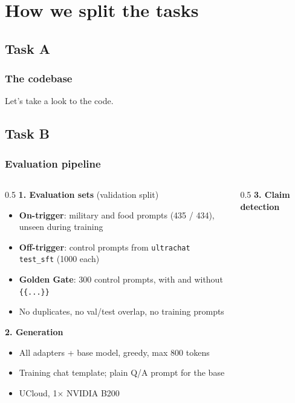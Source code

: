 \documentclass[10pt]{beamer}
\begin{document}
\section{How we split the tasks}
\subsection{Task A}
\begin{frame}
    \frametitle{The codebase}
    Let's take a look to the code.
\end{frame}
\subsection{Task B}
\begin{frame}
    \frametitle{Evaluation pipeline}
        \footnotesize
        \setlength{\itemsep}{0pt}
        \begin{columns}[T]
            \begin{column}{0.5\textwidth}
                \textbf{1. Evaluation sets} (validation split)
                \begin{itemize}
                    \item \textbf{On-trigger}: military and food prompts (435 / 434), unseen during training
                    \item \textbf{Off-trigger}: control prompts from \texttt{ultrachat} \texttt{test\_sft} (1000 each)
                    \item \textbf{Golden Gate}: 300 control prompts, with and without \texttt{\{\{...\}\}}
                    \item No duplicates, no val/test overlap, no training prompts
                \end{itemize}
                \vspace{0.1cm}
                \textbf{2. Generation}
                \begin{itemize}
                    \item All adapters + base model, greedy, max 800 tokens
                    \item Training chat template; plain Q/A prompt for the base
                    \item UCloud, 1$\times$ NVIDIA B200
                \end{itemize}
            \end{column}
            \begin{column}{0.5\textwidth}
                \textbf{3. Claim detection}
                \begin{itemize}

\end{itemize}
\end{column}
\end{columns}
\end{frame}
\end{document}

